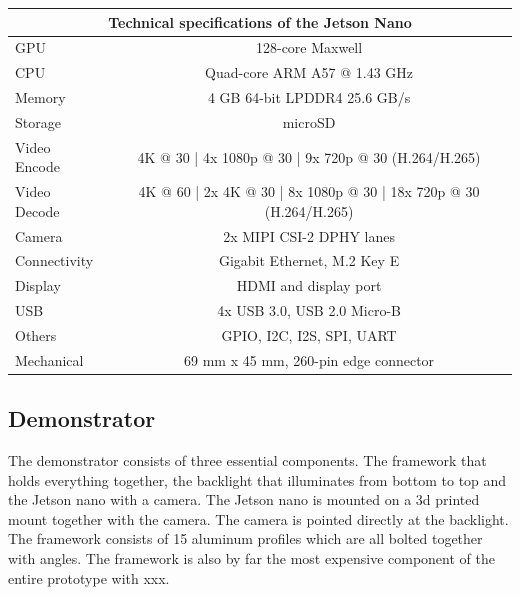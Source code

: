 \begin{tabular}{ |l c|  }
	\hline
	\multicolumn{2}{|c|}{Technical specifications of the Jetson Nano} \\
	\hline
	GPU			& 	128-core Maxwell\\
	CPU			& 	Quad-core ARM A57 @ 1.43 GHz \\
	Memory 		&	4 GB 64-bit LPDDR4 25.6 GB/s 				\\
	Storage		&	microSD				\\
	Video Encode&	4K @ 30 | 4x 1080p @ 30 | 9x 720p @ 30 (H.264/H.265) \\
	Video Decode&	4K @ 60 | 2x 4K @ 30 | 8x 1080p @ 30 | 18x 720p @ 30 (H.264/H.265) \\
	Camera 		&	2x MIPI CSI-2 DPHY lanes \\
	Connectivity&	Gigabit Ethernet, M.2 Key E\\
	Display 	&	HDMI and display port \\
	USB 		&	4x USB 3.0, USB 2.0 Micro-B\\
	Others 		&	GPIO, I2C, I2S, SPI, UART \\
	Mechanical 	&	69 mm x 45 mm, 260-pin edge connector \\
	
	\hline
\end{tabular}




\subsection{Demonstrator}
The demonstrator consists of three essential components. The framework that holds everything together, the backlight that illuminates from bottom to top and the Jetson nano with a camera. The Jetson nano is mounted on a 3d printed mount together with the camera. The camera is pointed directly at the backlight.  \\
The framework consists of 15 aluminum profiles which are all bolted together with angles. The framework is also by far the most expensive component of the entire prototype with xxx. 


